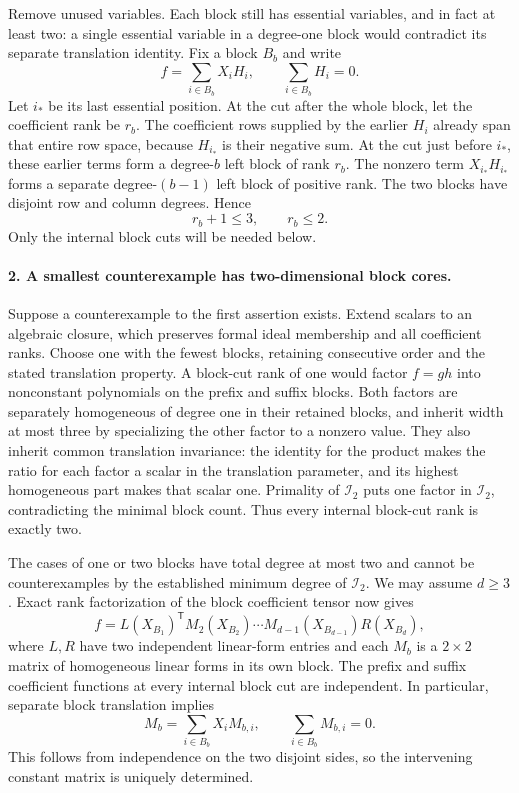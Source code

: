 Remove unused variables. Each block still has essential
variables, and in fact at least two: a single essential
variable in a degree-one block would contradict its separate
translation identity. Fix a block $B_b$ and write
\[
             f=\sum_{i\in B_b}X_i H_i,
             \qquad \sum_{i\in B_b}H_i=0.
 \tag{P20.3}
\]
Let $i_*$ be its last essential position. At the cut after
the whole block, let the coefficient rank be $r_b$.
The coefficient rows supplied by the earlier $H_i$ already
span that entire row space, because $H_{i_*}$ is their
negative sum. At the cut just before $i_*$, these earlier
terms form a degree-$b$ left block of rank $r_b$.
The nonzero term $X_{i_*}H_{i_*}$ forms a separate
degree-$(b-1)$ left block of positive rank. The two blocks
have disjoint row and column degrees. Hence
\[
                         r_b+1\le3,
                         \qquad r_b\le2.
 \tag{P20.4}
\]
Only the internal block cuts will be needed below.

\paragraph{2. A smallest counterexample has two-dimensional block cores.}
Suppose a counterexample to the first assertion exists.
Extend scalars to an algebraic closure, which preserves
formal ideal membership and all coefficient ranks. Choose
one with the fewest blocks, retaining consecutive order and
the stated translation property. A block-cut rank of one
would factor $f=gh$ into nonconstant polynomials on the
prefix and suffix blocks. Both factors are separately
homogeneous of degree one in their retained blocks, and
inherit width at most three by specializing the other
factor to a nonzero value. They also inherit common
translation invariance: the identity for the product makes
the ratio for each factor a scalar in the translation
parameter, and its highest homogeneous part makes that
scalar one. Primality of $\mathcal I_2$ puts one factor
in $\mathcal I_2$, contradicting the minimal block count.
Thus every internal block-cut rank is exactly two.

The cases of one or two blocks have total degree at most
two and cannot be counterexamples by the established
minimum degree of $\mathcal I_2$. We may assume $d\ge3$.
Exact rank factorization of the block coefficient tensor
now gives
\[
 f=L(X_{B_1})^{\mathsf T}
       M_2(X_{B_2})\cdots M_{d-1}(X_{B_{d-1}})
       R(X_{B_d}),
 \tag{P20.5}
\]
where $L,R$ have two independent linear-form entries and
each $M_b$ is a $2\times2$ matrix of homogeneous linear
forms in its own block. The prefix and suffix coefficient
functions at every internal block cut are independent.
In particular, separate block translation implies
\[
 M_b=\sum_{i\in B_b}X_i M_{b,i},\qquad
                       \sum_{i\in B_b}M_{b,i}=0.
 \tag{P20.6}
\]
This follows from independence on the two disjoint sides,
so the intervening constant matrix is uniquely determined.

